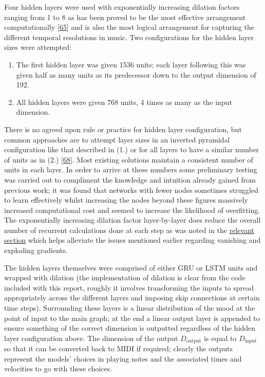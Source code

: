 \documentclass[12pt,]{article}
\providecommand{\tightlist}{%
  \setlength{\itemsep}{0pt}\setlength{\parskip}{0pt}}
\begin{document}
Four hidden layers were used with exponentially increasing dilation
factors ranging from 1 to 8 as has been proved to be the most effective
arrangement computationally
{[}\protect\hyperlink{ref-chang2017dilated}{65}{]} and is also the most
logical arrangement for capturing the different temporal resolutions in
music. Two configurations for the hidden layer sizes were attempted:

\begin{enumerate}
\def\labelenumi{\arabic{enumi}.}
\tightlist
\item
  The first hidden layer was given 1536 units; each layer following this
  was given half as many units as its predecessor down to the output
  dimension of 192.
\item
  All hidden layers were given 768 units, 4 times as many as the input
  dimension.
\end{enumerate}

There is no agreed upon rule or practice for hidden layer configuration,
but common approaches are to attempt layer sizes in an inverted
pyramidal configuration like that described in (1.) or for all layers to
have a similar number of units as in (2.)
{[}\protect\hyperlink{ref-doi10108001431160802549278}{68}{]}. Most
existing solutions maintain a consistent number of units in each layer.
In order to arrive at these numbers some preliminary testing was carried
out to compliment the knowledge and intuition already gained from
previous work; it was found that networks with fewer nodes sometimes
struggled to learn effectively whilst increasing the nodes beyond these
figures massively increased computational cost and seemed to increase
the likelihood of overfitting. The exponentially increasing dilation
factor layer-by-layer does reduce the overall number of recurrent
calculations done at each step as was noted in the
\protect\hyperlink{dilation}{relevant section} which helps alleviate the
issues mentioned earlier regarding vanishing and exploding gradients.

The hidden layers themselves were comprised of either GRU or LSTM units
and wrapped with dilation (the implementation of dilation is clear from
the code included with this report, roughly it involves transforming the
inputs to spread appropriately across the different layers and imposing
skip connections at certain time steps). Surrounding these layers is a
linear distribution of the mood at the point of input to the main graph;
at the end a linear output layer is appended to ensure something of the
correct dimension is outputted regardless of the hidden layer
configuration above. The dimension of the output \(D_{\text{output}}\)
is equal to \(D_{\text{input}}\) so that it can be converted back to
MIDI if required; clearly the outputs represent the models' choices in
playing notes and the associated times and velocities to go with these
choices.
\end{document}
